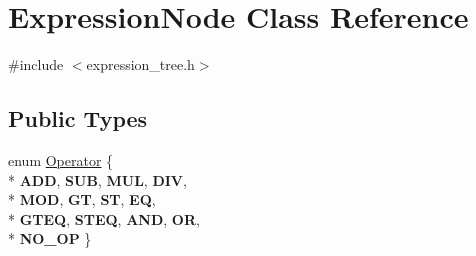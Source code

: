 \hypertarget{classExpressionNode}{}\section{Expression\+Node Class Reference}
\label{classExpressionNode}


{\ttfamily \#include $<$expression\+\_\+tree.\+h$>$}

\subsection*{Public Types}
\begin{DoxyCompactItemize}
\item 
enum \hyperlink{classExpressionNode_a7735465f9aac516880869e4a630d2569}{Operator} \{ \\*
{\bfseries A\+D\+D}, 
{\bfseries S\+U\+B}, 
{\bfseries M\+U\+L}, 
{\bfseries D\+I\+V}, 
\\*
{\bfseries M\+O\+D}, 
{\bfseries G\+T}, 
{\bfseries S\+T}, 
{\bfseries E\+Q}, 
\\*
{\bfseries G\+T\+E\+Q}, 
{\bfseries S\+T\+E\+Q}, 
{\bfseries A\+N\+D}, 
{\bfseries O\+R}, 
\\*
{\bfseries N\+O\+\_\+\+O\+P}
 \}
\end{DoxyCompactItemize}
